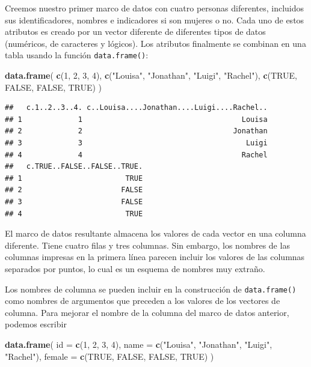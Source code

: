 \documentclass[
]{book}
\newenvironment{Shaded}{\begin{snugshade}}{\end{snugshade}}
\newcommand{\DataTypeTok}[1]{\textcolor[rgb]{0.13,0.29,0.53}{#1}}
\newcommand{\DecValTok}[1]{\textcolor[rgb]{0.00,0.00,0.81}{#1}}
\newcommand{\KeywordTok}[1]{\textcolor[rgb]{0.13,0.29,0.53}{\textbf{#1}}}
\newcommand{\NormalTok}[1]{#1}
\newcommand{\OtherTok}[1]{\textcolor[rgb]{0.56,0.35,0.01}{#1}}
\newcommand{\StringTok}[1]{\textcolor[rgb]{0.31,0.60,0.02}{#1}}
\begin{document}
Creemos nuestro primer marco de datos con cuatro personas diferentes, incluidos sus identificadores, nombres e indicadores si son mujeres o no. Cada uno de estos atributos es creado por un vector diferente de diferentes tipos de datos (numéricos, de caracteres y lógicos). Los atributos finalmente se combinan en una tabla usando la función \texttt{data.frame()}:

\begin{Shaded}
\begin{Highlighting}[]
\KeywordTok{data.frame}\NormalTok{(}
  \KeywordTok{c}\NormalTok{(}\DecValTok{1}\NormalTok{, }\DecValTok{2}\NormalTok{, }\DecValTok{3}\NormalTok{, }\DecValTok{4}\NormalTok{),}
  \KeywordTok{c}\NormalTok{(}\StringTok{"Louisa"}\NormalTok{, }\StringTok{"Jonathan"}\NormalTok{, }\StringTok{"Luigi"}\NormalTok{, }\StringTok{"Rachel"}\NormalTok{),}
  \KeywordTok{c}\NormalTok{(}\OtherTok{TRUE}\NormalTok{, }\OtherTok{FALSE}\NormalTok{, }\OtherTok{FALSE}\NormalTok{, }\OtherTok{TRUE}\NormalTok{)}
\NormalTok{)}
\end{Highlighting}
\end{Shaded}

\begin{verbatim}
##   c.1..2..3..4. c..Louisa....Jonathan....Luigi....Rachel..
## 1             1                                     Louisa
## 2             2                                   Jonathan
## 3             3                                      Luigi
## 4             4                                     Rachel
##   c.TRUE..FALSE..FALSE..TRUE.
## 1                        TRUE
## 2                       FALSE
## 3                       FALSE
## 4                        TRUE
\end{verbatim}

El marco de datos resultante almacena los valores de cada vector en una columna diferente. Tiene cuatro filas y tres columnas. Sin embargo, los nombres de las columnas impresas en la primera línea parecen incluir los valores de las columnas separados por puntos, lo cual es un esquema de nombres muy extraño.

Los nombres de columna se pueden incluir en la construcción de \texttt{data.frame()} como nombres de argumentos que preceden a los valores de los vectores de columna. Para mejorar el nombre de la columna del marco de datos anterior, podemos escribir

\begin{Shaded}
\begin{Highlighting}[]
\KeywordTok{data.frame}\NormalTok{(}
  \DataTypeTok{id =} \KeywordTok{c}\NormalTok{(}\DecValTok{1}\NormalTok{, }\DecValTok{2}\NormalTok{, }\DecValTok{3}\NormalTok{, }\DecValTok{4}\NormalTok{),}
  \DataTypeTok{name =} \KeywordTok{c}\NormalTok{(}\StringTok{"Louisa"}\NormalTok{, }\StringTok{"Jonathan"}\NormalTok{, }\StringTok{"Luigi"}\NormalTok{, }\StringTok{"Rachel"}\NormalTok{),}
  \DataTypeTok{female =} \KeywordTok{c}\NormalTok{(}\OtherTok{TRUE}\NormalTok{, }\OtherTok{FALSE}\NormalTok{, }\OtherTok{FALSE}\NormalTok{, }\OtherTok{TRUE}\NormalTok{)}
\NormalTok{)}
\end{Highlighting}
\end{Shaded}
\end{document}

